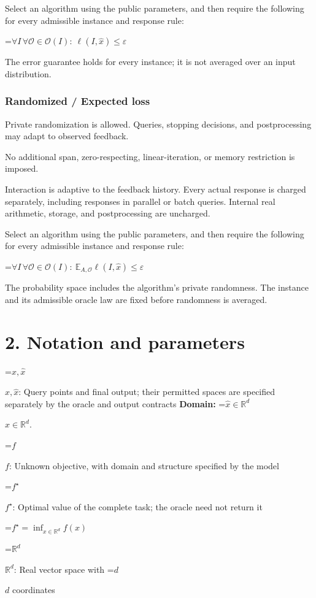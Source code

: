 \documentclass[10pt,a4paper]{article}
\newcommand{\AtlasMath}[1]{\par\begingroup\centering\setbox0=\hbox{$\displaystyle #1$}\ifdim\wd0>1.4\linewidth\typeout{ATLAS WIDE FORMULA: \the\wd0}\fi\ifdim\wd0>\linewidth\resizebox{\linewidth}{!}{\box0}\else\box0\fi\par\endgroup}
\newcommand{\AtlasInlineMath}[1]{\begingroup\setbox0=\hbox{$#1$}\ifdim\wd0>.4\linewidth\endgroup\AtlasMath{#1}\else\endgroup$#1$\fi}
\begin{document}
Select an algorithm using the public parameters, and then require the following for every admissible instance and response rule:


\AtlasMath{\forall I\,\forall\mathcal{O}\in\mathcal{O}(I):\ \ell(I,\widehat{x})\le\varepsilon}


The error guarantee holds for every instance; it is not averaged over an input distribution.

\subsubsection{Randomized / Expected loss}
Private randomization is allowed. Queries, stopping decisions, and postprocessing may adapt to observed feedback.

No additional span, zero-respecting, linear-iteration, or memory restriction is imposed.

Interaction is adaptive to the feedback history. Every actual response is charged separately, including responses in parallel or batch queries. Internal real arithmetic, storage, and postprocessing are uncharged.

Select an algorithm using the public parameters, and then require the following for every admissible instance and response rule:


\AtlasMath{\forall I\,\forall\mathcal{O}\in\mathcal{O}(I):\ \mathbb{E}_{A,\mathcal{O}}\ell(I,\widehat{x})\le\varepsilon}


The probability space includes the algorithm's private randomness. The instance and its admissible oracle law are fixed before randomness is averaged.

\section{2. Notation and parameters}
\AtlasInlineMath{x,\widehat{x}}: Query points and final output; their permitted spaces are specified separately by the oracle and output contracts \textbf{Domain:} \AtlasInlineMath{\widehat{x}\in \mathbb{R}^d}.

\AtlasInlineMath{f}: Unknown objective, with domain and structure specified by the model

\AtlasInlineMath{f^\star}: Optimal value of the complete task; the oracle need not return it


\AtlasMath{f^\star=\inf_{x\in \mathbb{R}^d}f(x)}


\AtlasInlineMath{\mathbb{R}^d}: Real vector space with \AtlasInlineMath{d} coordinates
\end{document}
